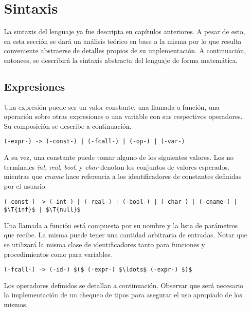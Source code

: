 \documentclass{article}
\begin{document}
\section{Sintaxis}

La sintaxis del lenguaje ya fue descripta en capítulos anteriores.
A pesar de esto, en esta sección se dará un análisis teórico en base a la misma por lo que resulta conveniente abstraerse de detalles propios de su implementación.
A continuación, entonces, se describirá la sintaxis abstracta del lenguaje de forma matemática.

\subsection{Expresiones}

Una expresión puede ser un valor constante, una llamada a función, una operación sobre otras expresiones o una variable con sus respectivos operadores.
Su composición se describe a continuación.

\begin{lstlisting}[style = syntax]
(-expr-) -> (-const-) | (-fcall-) | (-op-) | (-var-)
\end{lstlisting}

A su vez, una constante puede tomar alguno de los siguientes valores.
Los no terminales \textit{int}, \textit{real}, \textit{bool}, y \textit{char} denotan los conjuntos de valores esperados, mientras que \textit{cname} hace referencia a los identificadores de constantes definidas por el usuario.

\begin{lstlisting}[style = syntax]
(-const-) -> (-int-) | (-real-) | (-bool-) | (-char-) | (-cname-) | $\T{inf}$ | $\T{null}$
\end{lstlisting}

Una llamada a función está compuesta por su nombre y la lista de parámetros que recibe.
La misma puede tener una cantidad arbitraria de entradas.
Notar que se utilizará la misma clase de identificadores tanto para funciones y procedimientos como para variables.

\begin{lstlisting}[style = syntax]
(-fcall-) -> (-id-) $($ (-expr-) $\ldots$ (-expr-) $)$
\end{lstlisting}

Los operadores definidos se detallan a continuación.
Observar que será necesario la implementación de un chequeo de tipos para asegurar el uso apropiado de los mismos.
\end{document}
